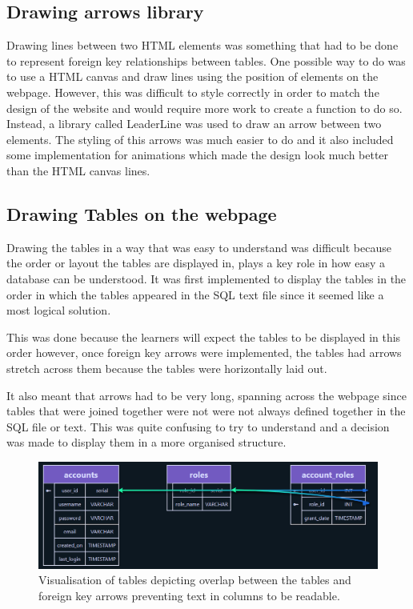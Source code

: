 \subsection{Drawing arrows library}

Drawing lines between two HTML elements was something that had to be done to represent foreign key relationships between tables. One possible way to do was to use a HTML canvas and draw lines using the position of elements on the webpage. However, this was difficult to style correctly in order to match the design of the website and would require more work to create a function to do so. Instead, a library called LeaderLine \cite{leaderLine} was used to draw an arrow between two elements. The styling of this arrows was much easier to do and it also included some implementation for animations which made the design look much better than the HTML canvas lines.

\subsection{Drawing Tables on the webpage}

Drawing the tables in a way that was easy to understand was difficult because the order or layout the tables are displayed in, plays a key role in how easy a database can be understood. It was first implemented to display the tables in the order in which the tables appeared in the SQL text file since it seemed like a most logical solution. 

This was done because the learners will expect the tables to be displayed in this order however, once foreign key arrows were implemented, the tables had arrows stretch across them because the tables were horizontally laid out. 

It also meant that arrows had to be very long, spanning across the webpage since tables that were joined together were not were not always defined together in the SQL file or text. This was quite confusing to try to understand and a decision was made to display them in a more organised structure. 

\begin{figure}[h!]
	\centering
	\includegraphics[width=\textwidth]{overlap}
	\caption{Visualisation of tables depicting overlap between the tables and foreign key arrows preventing text in columns to be readable.}
	\label{fig:overlap}
\end{figure}

